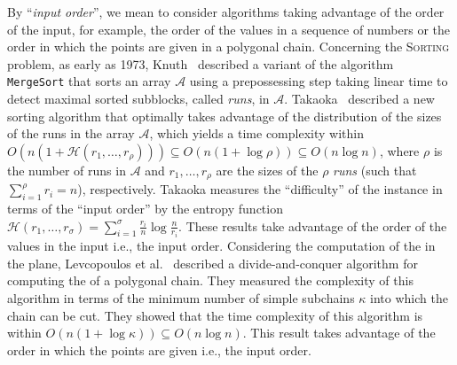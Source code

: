 By ``\emph{input order}'', we mean to consider algorithms taking advantage of the
order of the input, for example, the order of the values in a sequence
of numbers or the order in which the points are given in a
polygonal chain.
Concerning the \textsc{Sorting} problem, as early as 1973,
Knuth~\cite{1973-BOOK-TheArtOfComputerProgrammingVol3-Knuth} described
a variant of the algorithm {\tt{MergeSort}} that sorts an array
$\mathcal{A}$ using a prepossessing step taking linear time to detect
maximal sorted subblocks, called \emph{runs}, in $\mathcal{A}$.
Takaoka~\cite{2009-Chapter-PartialSolutionAndEntropy-Takaoka}
described a new sorting algorithm that optimally takes advantage of
the distribution of the sizes of the runs in the array $\mathcal{A}$,
which yields a time complexity within
$O(n(1+\mathcal{H}(r_1, \dots, r_{\rho}))) \subseteq
O(n(1{+}\log{\rho})) \subseteq O(n\log{n})$, where $\rho$ is the
number of runs in $\mathcal{A}$ and $r_1, \dots, r_{\rho}$ are the
sizes of the $\rho$ \emph{runs} (such that $\sum_{i=1}^\rho {r_i}=n$),
respectively. Takaoka measures the ``difficulty'' of the instance in
terms of the ``input order'' by the entropy function
$\mathcal{H}(r_1, \dots, r_\sigma) =
\sum_{i=1}^\sigma{\frac{r_i}{n}}\log{\frac{n}{r_i}}$. These results
take advantage of the order of the values in the input i.e., the input
order.
Considering the computation of the {} in the plane,
Levcopoulos et
al.~\cite{2002-SWAT-AdaptiveAlgorithmsForConstructingConvexHullsAndTriangulationsOfPolygonalChains-LevcopoulosLingasMitchell}
described a divide-and-conquer algorithm for computing the {} of a polygonal chain. They measured the complexity of this
algorithm in terms of the minimum number of simple subchains $\kappa$
into which the chain can be cut.  They showed that the time complexity
of this algorithm is within
$O(n(1{+}\log{\kappa})) \subseteq O(n\log{n})$. This result takes
advantage of the order in which the points are given i.e., the input
order.

